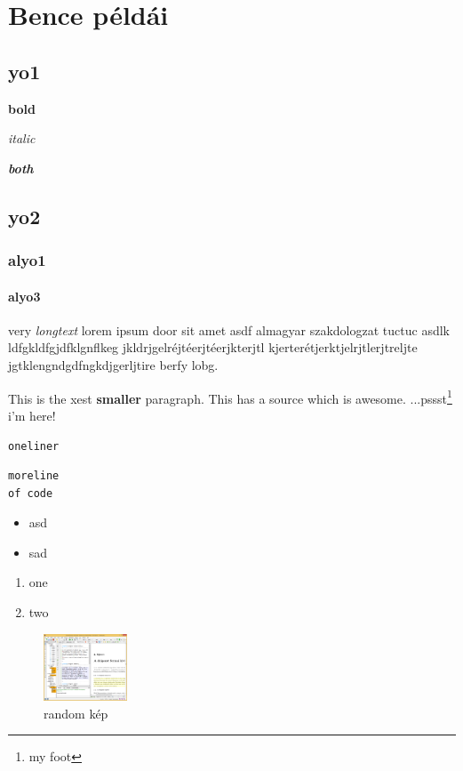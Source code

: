 \chapter{Bence példái}

\section{yo1}
\textbf{bold}

\textit{italic}

\textbf{\textit{both}}

\section{yo2}
\subsection{alyo1}
\subsubsection{alyo3}

very \textit{longtext} lorem ipsum door sit amet asdf almagyar szakdologzat tuctuc asdlk ldfgkldfgjdfklgnflkeg jkldrjgelréjtéerjtéerjkterjtl kjerterétjerktjelrjtlerjtreljte jgtklengndgdfngkdjgerljtire berfy lobg.

This is the xest \textbf{smaller} paragraph.
This has a source\cite{RaptorSite} which is awesome. ...pssst\footnote{my foot} i'm here!

\lstinline{oneliner}
\begin{lstlisting}
moreline
of code
\end{lstlisting}

\begin{itemize}
    \item asd
    \item sad
\end{itemize}

\begin{enumerate}
    \item one
    \item two
\end{enumerate}

\begin{figure}[ht]
\centering
\includegraphics[width=25mm, keepaspectratio]{figures/TeXstudio.png}
\caption{random kép} 
\end{figure}